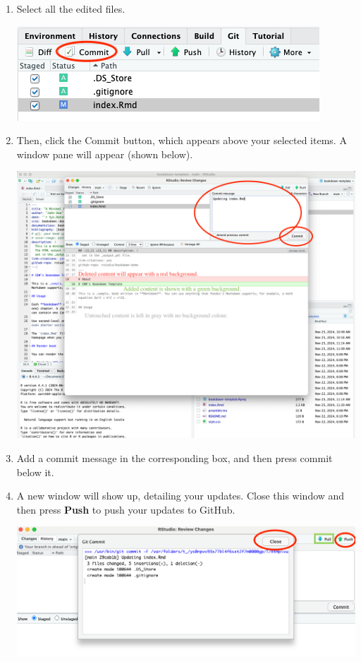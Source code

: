 \documentclass[
]{book}
\theoremstyle{definition}
\theoremstyle{definition}
\theoremstyle{definition}
\theoremstyle{definition}
\theoremstyle{remark}
\begin{document}
\begin{enumerate}
\def\labelenumi{\arabic{enumi}.}
\item
  Select all the edited files.

  \includegraphics{img/git-instruct/git-window-selected-items.png}\\
\item
  Then, click the Commit button, which appears above your selected items. A window pane will appear (shown below).

  \includegraphics{img/git-instruct/git-commit-window.png}\\
\item
  Add a commit message in the corresponding box, and then press commit below it.
\item
  A new window will show up, detailing your updates. Close this window and then press \textbf{Push} to push your updates to GitHub.

  \includegraphics{img/git-instruct/git-window-post-commit.png}\\
\end{enumerate}
\end{document}
